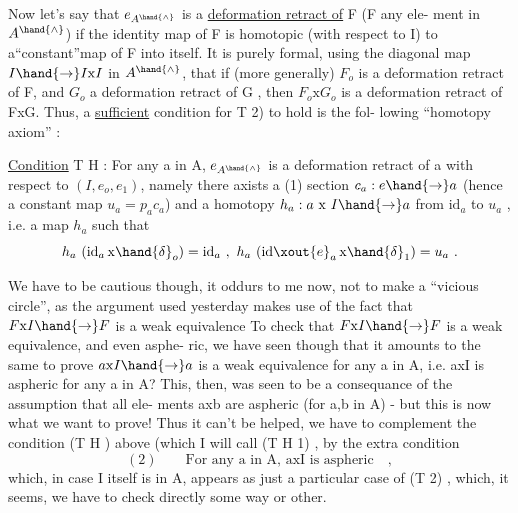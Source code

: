 
Now let's say that $e_{A^{\hand{\wedge}}}$ is a  \uline{deformation retract of} F (F any ele-%
ment in $A^{\hand{\wedge}}$) if the identity map of F is homotopic (with respect to I) to
a``constant''map of F into itself.  It is purely formal,  using the diagonal
map $I\hand{\to} I\mathrm{x}I$ in $A^{\hand{\wedge}}$,  that if (more generally) $F_o$ is a deformation retract
of F,  and $G_o$ a deformation retract of G ,  then $F_o\mathrm{x}G_o$ is a deformation
retract of FxG. Thus, a \uline{sufficient} condition for T 2) to hold is the fol-%
lowing ``homotopy axiom'' :

\uline{Condition}  T H :  For any  a in A,   $e_{A^{\hand{\wedge}}}$ is a deformation retract of
a with respect to $(I,e_o,e_1)$,  namely there axists a
(1)  section  $c_a : e\hand{\to} a$  (hence a constant map $u_a = p_a c_a$)
and a homotopy  $h_a : a\ \mathrm{x}\ I\hand{\to} a$ from $\mathrm{id}_a$  to $u_a$ ,  i.e.
a map $h_a$ such that
\[ h_a\ (\mathrm{id}_a\,\mathrm{x}\hand{\delta}_o) = \mathrm{id}_a\ ,\ h_a\ (\mathrm{id}\xout{e}_a\,\mathrm{x}\hand{\delta}_1) = u_a\ . \]

We have to be cautious though,  it oddurs to me now,  not to make a
``vicious circle'',  as the  argument used yesterday  makes use of the fact
that   $F\mathrm{x}I\hand{\to} F$  is a weak equivalence  To check that $F\mathrm{x}I\hand{\to} F$ is a weak equivalence,  and even asphe-%
ric,  we have seen though that it amounts to the same to prove $a\mathrm{x}I\hand{\to} a$ is a
weak equivalence for any a in A,  i.e. axI is aspheric for any a in A?
This,  then,  was seen to be a consequance of the assumption that all ele-%
ments axb are aspheric (for a,b in A)  -  but this  is now what we want to
prove!  Thus it can't be helped,  we have to complement the condition
(T H ) above  (which I will call  (T H 1) ,  by the extra condition
\[ (2)\qquad \text{For any a in A,  axI is aspheric}\quad , \]
which,  in case I itself is in A,  appears as just a particular case of
(T 2) ,  which, it seems,  we have to check directly some way or other.

